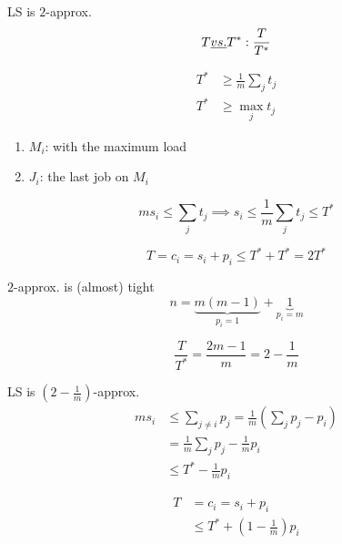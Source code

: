 \begin{frame}{LS is $2$-approx.}
  \[
	T \emph{ vs. } T^{\ast}: \frac{T}{T^{\ast}}
  \]

  \begin{align*}
	T^{\ast} &\ge \frac{1}{m} \sum_{j} t_j \\
	T^{\ast} &\ge \max_{j} t_j
  \end{align*}

  \begin{enumerate}
	\item $M_i$: with the maximum load
	\item $J_i$: the last job on $M_i$
  \end{enumerate}

  \[
	ms_i \le \sum_{j} t_j \implies s_i \le \frac{1}{m} \sum_{j} t_j \le T^{\ast}
  \]

  \[
	T = c_i = s_i + p_i \le T^{\ast} + T^{\ast} = 2T^{\ast}
  \]
\end{frame}
\begin{frame}{$2$-approx. is (almost) tight}
  \[
	n = \underbrace{m(m - 1)}_{p_i = 1} + \underbrace{1}_{p_i = m}
  \]

  \[
	\frac{T}{T^{\ast}} = \frac{2m - 1}{m} = 2 - \frac{1}{m}
  \]
\end{frame}
\begin{frame}{LS is $(2-\frac{1}{m})$-approx.}
  \begin{align*}
	m s_i &\le \sum_{j \neq i} p_j = \frac{1}{m} (\sum_{j} p_j - p_i) \\
	&= \frac{1}{m} \sum_{j} p_j - \frac{1}{m} p_i \\
	&\le T^{\ast} - \frac{1}{m} p_i
  \end{align*}

  \begin{align*}
	T &= c_i = s_i + p_i \\
	&\le T^{\ast} + (1 - \frac{1}{m}) p_i
  \end{align*}
\end{frame}
